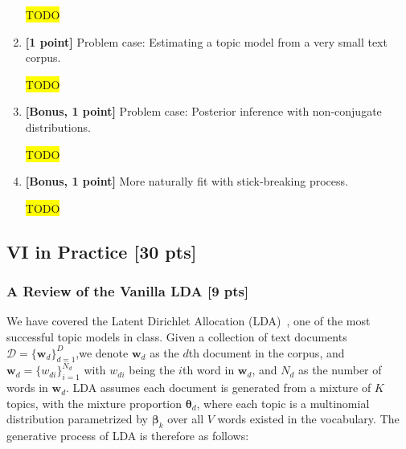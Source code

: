 \documentclass[10pt]{article}
\newcommand{\hilight}[1]{\colorbox{yellow}{#1}}
\begin{document}
\begin{enumerate}
\begin{solution}
\hilight{TODO}
\end{solution}
    \item \textbf{[1 point]} Problem case: Estimating a topic model from a very small text corpus.
\begin{solution}
\hilight{TODO}
\end{solution}
    \item \textbf{[Bonus, 1 point]} Problem case: Posterior inference with non-conjugate distributions.
\begin{solution}
\hilight{TODO}
\end{solution}
    \item \textbf{[Bonus, 1 point]} More naturally fit with stick-breaking process.
\begin{solution}
\hilight{TODO}
\end{solution}
\end{enumerate}


\subsection{VI in Practice [30 pts]}
\subsubsection{A Review of the Vanilla LDA [9 pts]}
We have covered the Latent Dirichlet Allocation (LDA)~\cite{blei2003latent}, one of the most successful topic models in class. Given a collection of text documents $\mathcal{D} = \{\bm{w}_d\}_{d=1}^D$,we denote $\bm{w}_d$ as the $d$th document in the corpus, and $\bm{w}_d = \{w_{di}\}_{i=1}^{N_d}$ with $w_{di}$ being the $i$th word in $\bm{w}_d$, and $N_d$ as the number of words in $\bm{w}_d$. LDA assumes each document is generated from a mixture of $K$ topics, with the mixture proportion $\bm{\theta}_d$, where each topic is a multinomial distribution parametrized by $\bm{\beta}_{k}$ over all $V$ words existed in the vocabulary. The generative process of LDA is therefore as follows:
\end{document}
